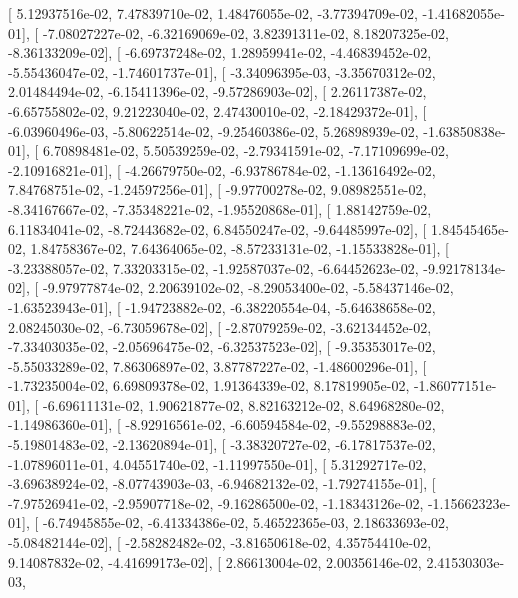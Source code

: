 \documentclass{article}
\begin{document}
       [  5.12937516e-02,   7.47839710e-02,   1.48476055e-02,
         -3.77394709e-02,  -1.41682055e-01],
       [ -7.08027227e-02,  -6.32169069e-02,   3.82391311e-02,
          8.18207325e-02,  -8.36133209e-02],
       [ -6.69737248e-02,   1.28959941e-02,  -4.46839452e-02,
         -5.55436047e-02,  -1.74601737e-01],
       [ -3.34096395e-03,  -3.35670312e-02,   2.01484494e-02,
         -6.15411396e-02,  -9.57286903e-02],
       [  2.26117387e-02,  -6.65755802e-02,   9.21223040e-02,
          2.47430010e-02,  -2.18429372e-01],
       [ -6.03960496e-03,  -5.80622514e-02,  -9.25460386e-02,
          5.26898939e-02,  -1.63850838e-01],
       [  6.70898481e-02,   5.50539259e-02,  -2.79341591e-02,
         -7.17109699e-02,  -2.10916821e-01],
       [ -4.26679750e-02,  -6.93786784e-02,  -1.13616492e-02,
          7.84768751e-02,  -1.24597256e-01],
       [ -9.97700278e-02,   9.08982551e-02,  -8.34167667e-02,
         -7.35348221e-02,  -1.95520868e-01],
       [  1.88142759e-02,   6.11834041e-02,  -8.72443682e-02,
          6.84550247e-02,  -9.64485997e-02],
       [  1.84545465e-02,   1.84758367e-02,   7.64364065e-02,
         -8.57233131e-02,  -1.15533828e-01],
       [ -3.23388057e-02,   7.33203315e-02,  -1.92587037e-02,
         -6.64452623e-02,  -9.92178134e-02],
       [ -9.97977874e-02,   2.20639102e-02,  -8.29053400e-02,
         -5.58437146e-02,  -1.63523943e-01],
       [ -1.94723882e-02,  -6.38220554e-04,  -5.64638658e-02,
          2.08245030e-02,  -6.73059678e-02],
       [ -2.87079259e-02,  -3.62134452e-02,  -7.33403035e-02,
         -2.05696475e-02,  -6.32537523e-02],
       [ -9.35353017e-02,  -5.55033289e-02,   7.86306897e-02,
          3.87787227e-02,  -1.48600296e-01],
       [ -1.73235004e-02,   6.69809378e-02,   1.91364339e-02,
          8.17819905e-02,  -1.86077151e-01],
       [ -6.69611131e-02,   1.90621877e-02,   8.82163212e-02,
          8.64968280e-02,  -1.14986360e-01],
       [ -8.92916561e-02,  -6.60594584e-02,  -9.55298883e-02,
         -5.19801483e-02,  -2.13620894e-01],
       [ -3.38320727e-02,  -6.17817537e-02,  -1.07896011e-01,
          4.04551740e-02,  -1.11997550e-01],
       [  5.31292717e-02,  -3.69638924e-02,  -8.07743903e-03,
         -6.94682132e-02,  -1.79274155e-01],
       [ -7.97526941e-02,  -2.95907718e-02,  -9.16286500e-02,
         -1.18343126e-02,  -1.15662323e-01],
       [ -6.74945855e-02,  -6.41334386e-02,   5.46522365e-03,
          2.18633693e-02,  -5.08482144e-02],
       [ -2.58282482e-02,  -3.81650618e-02,   4.35754410e-02,
          9.14087832e-02,  -4.41699173e-02],
       [  2.86613004e-02,   2.00356146e-02,   2.41530303e-03,
\end{document}
